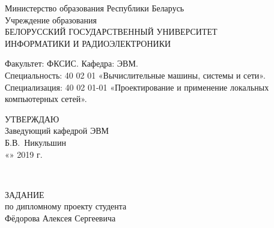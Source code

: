 
    \begin{center}
      Министерство образования Республики Беларусь\\[1em]
      Учреждение образования\\
      БЕЛОРУССКИЙ ГОСУДАРСТВЕННЫЙ УНИВЕРСИТЕТ \\
      ИНФОРМАТИКИ И РАДИОЭЛЕКТРОНИКИ\\[1em]
    \end{center}
      Факультет: ФКСИС. Кафедра: ЭВМ. \\
      Специальность: 40 02 01 «Вычислительные машины, системы и сети». \\
      Специализация: 40 02 01-01 «Проектирование и применение локальных
      компьютерных сетей».

      \begin{flushright}
        \begin{minipage}{0.4\textwidth}
          \MakeUppercase{Утверждаю}\\
          Заведующий кафедрой ЭВМ\\
          \underline{\hspace*{2.2cm}} Б.В.~Никульшин \\
          «\underline{\hspace*{1cm}}» \underline{\hspace*{2.5cm}} 2019 г.
        \end{minipage}\\[1em]
      \end{flushright}

    \begin{center}
      {ЗАДАНИЕ}\\
      {по дипломному проекту студента}\\
      {Фёдорова Алексея Сергеевича}\\[1em]
    \end{center}

